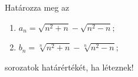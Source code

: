 \documentclass[11pt]{scrartcl}
\begin{document}
Határozza meg az
\begin{enumerate}
	\item \(\displaystyle
	      a_n = \sqrt{n^2 + n} - \sqrt{n^2 - n};
	      \)

	\item \(\displaystyle
	      b_n = \sqrt[n]{n^2 + n} - \sqrt[n]{n^2 - n};
	      \)
\end{enumerate}
sorozatok határértékét, ha léteznek!
\end{document}
